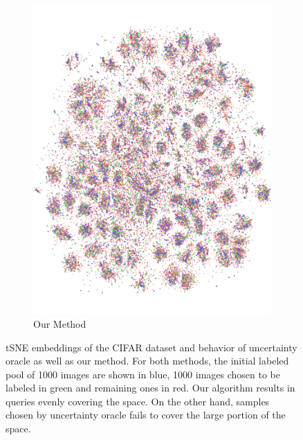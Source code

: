 \documentclass{article} %
\begin{document}
\begin{figure}[tb]
\begin{minipage}[t]{0.49\textwidth}
\begin{center}
\begin{subfigure}[b]{0.49\textwidth}
		\includegraphics[width=\columnwidth]{fig1_b_1.pdf}
		\caption{Our Method}
    \end{subfigure}
\end{center}
 \caption{tSNE embeddings of the CIFAR dataset and behavior of uncertainty oracle as well as our method. For both methods, the initial labeled pool of 1000 images are shown in blue, 1000 images chosen to be labeled in green and remaining ones in red. Our algorithm results in queries evenly covering the space. On the other hand, samples chosen by uncertainty oracle fails to cover the large portion of the space.}
\end{minipage} \quad
\begin{minipage}[t]{0.49\textwidth}
\vspace{-50mm}
\vspace{-2mm}
\setlength{\tabcolsep}{1mm}
\label{tab:runtime}


\end{minipage}
\end{figure}
\end{document}
